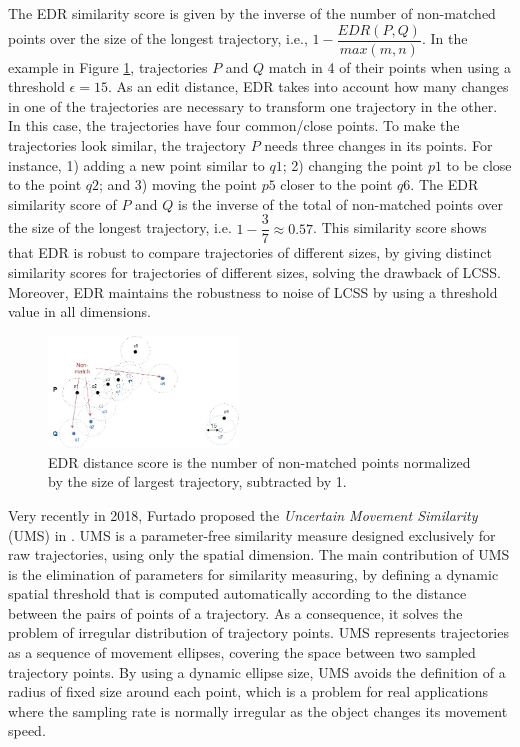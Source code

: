The EDR similarity score is given by the inverse of the number of non-matched points over the size of the longest trajectory, i.e., $1 - \dfrac{EDR(P, Q)}{max(m, n)}$. In the example in Figure \ref{fig:related_trajes_EDR}, trajectories $P$ and $Q$ match in 4 of their points when using a threshold $\epsilon =15$. As an edit distance, EDR takes into account how many changes in one of the trajectories are necessary to transform one trajectory in the other. In this case, the trajectories have four common/close points. To make the trajectories look similar, the trajectory $P$ needs three changes in its points. For instance, 1) adding a new point similar to $q1$; 2) changing the point $p1$ to be close to the point $q2$; and 3) moving the point $p5$ closer to the point $q6$. The EDR similarity score of $P$ and $Q$ is the inverse of the total of non-matched points over the size of the longest trajectory, i.e. $1 - \dfrac{3}{7} \approx 0.57$.
This similarity score shows that EDR is robust to compare trajectories of different sizes, by giving distinct similarity scores for trajectories of different sizes, solving the drawback of LCSS. Moreover, EDR maintains the robustness to noise of LCSS by using a threshold value in all dimensions.

\begin{figure}[h]
\centering
\includegraphics[width=0.45\textwidth]{Related_Works/related_trajes-EDR.jpg}
\caption{\label{fig:related_trajes_EDR}EDR distance score is the number of non-matched points normalized by the size of largest trajectory, subtracted by 1.}
\end{figure}

Very recently in 2018, Furtado proposed the \emph{Uncertain Movement Similarity} (UMS) in \cite{Furtado-UMS-2018}. UMS is a parameter-free similarity measure designed exclusively for raw trajectories, using only the spatial dimension. The main contribution of UMS is the elimination of parameters for similarity measuring, by defining a dynamic spatial threshold that is computed automatically according to the distance between the pairs of points of a trajectory. As a consequence, it solves the problem of irregular distribution of trajectory points. UMS represents trajectories as a sequence of movement ellipses, covering the space between two sampled trajectory points.
By using a dynamic ellipse size,  UMS avoids the definition of a radius of fixed size around each point, which is a problem for real applications where the sampling rate is normally irregular as the object changes its movement speed.

